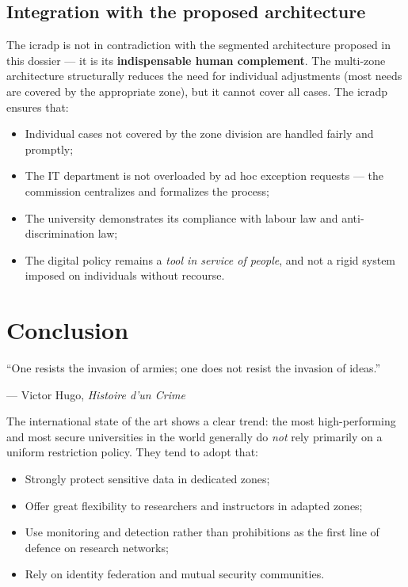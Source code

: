\subsection{Integration with the proposed architecture}

The \gls{icradp} is not in contradiction with the segmented architecture
proposed in this dossier --- it is its \textbf{indispensable human
complement}. The multi-zone architecture structurally reduces
the need for individual adjustments (most needs are
covered by the appropriate zone), but it cannot cover all
cases. The \gls{icradp} ensures that:

\begin{itemize}[nosep]
    \item Individual cases not covered by the zone division
    are handled fairly and promptly;
    \item The IT department is not overloaded by ad hoc exception
    requests --- the commission centralizes and formalizes the process;
    \item The university demonstrates its compliance with labour law and
    anti-discrimination law;
    \item The digital policy remains a \emph{tool in service of
    people}, and not a rigid system imposed on individuals
    without recourse.
\end{itemize}

\section{Conclusion}
\label{sec:conclusion}

\epigraph{``One resists the invasion of armies; one does not resist the invasion of ideas.''}{--- Victor Hugo, \textit{Histoire d'un Crime}~\cite{hugo1877}}

The international state of the art shows a clear trend: the most
high-performing and most secure universities in the world generally do \emph{not}
rely primarily on a uniform restriction policy. They tend to adopt
 that:

\begin{itemize}[nosep]
    \item Strongly protect sensitive data in dedicated zones;
    \item Offer great flexibility to researchers and instructors
    in adapted zones;
    \item Use monitoring and detection rather than
    prohibitions as the first line of defence on research
    networks;
    \item Rely on identity federation and mutual
    security communities.
\end{itemize}


